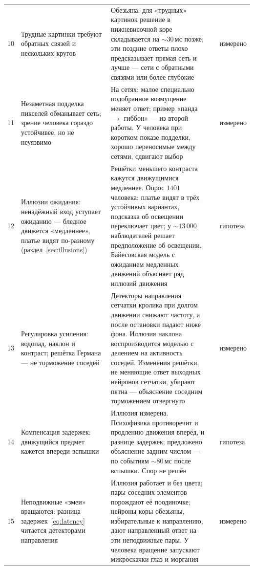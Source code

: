{\begin{longtable}{>{\raggedright}p{0.5cm}>{\raggedright}p{4.0cm}>{\raggedright}p{5.6cm}>{\raggedright}p{2.3cm}>{\raggedright\arraybackslash}p{1.7cm}}
10 & Трудные картинки требуют обратных связей и нескольких кругов & Обезьяна: для «трудных» картинок решение в нижневисочной коре складывается на $\sim30$\,мс позже; эти поздние ответы плохо предсказывает прямая сеть и лучше --- сети с обратными связями или более глубокие & \cite{Kar2019} & измерено \\
11 & Незаметная подделка пикселей обманывает сеть; зрение человека гораздо устойчивее, но не неуязвимо & На сетях: малое специально подобранное возмущение меняет ответ; пример «панда $\to$ гиббон» --- из второй работы. У человека при коротком показе подделки, хорошо переносимые между сетями, сдвигают выбор & \cite{Szegedy2014,Goodfellow2015,Elsayed2018} & измерено \\
12 & Иллюзии ожидания: ненадёжный вход уступает ожиданию --- бледное движется «медленнее», платье видят по-разному (раздел~\ref{sec:illusions}) & Решётки меньшего контраста кажутся движущимися медленнее. Опрос $1401$ человека: платье видят в трёх устойчивых вариантах, подсказка об освещении переключает цвет; у $\sim13\,000$ наблюдателей решает предположение об освещении. Байесовская модель с ожиданием медленных движений объясняет ряд иллюзий движения & \cite{Thompson1982,LaferSousa2015,Wallisch2017,Weiss2002,Purves2011} & гипотеза \\
13 & Регулировка усиления: водопад, наклон и контраст; решётка Германа --- не торможение соседей & Детекторы направления сетчатки кролика при долгом движении снижают частоту, а после остановки падают ниже фона. Иллюзия наклона воспроизводится моделью с делением на активность соседей. Изменения решётки, не меняющие ответ выходных нейронов сетчатки, убирают пятна --- объяснение соседним торможением отвергнуто & \cite{BarlowHill1963,Schwartz2009,SchillerCarvey2005} & измерено \\
14 & Компенсация задержек: движущийся предмет кажется впереди вспышки & Иллюзия измерена. Психофизика противоречит и продлению движения вперёд, и разнице задержек; предложено объяснение задним числом --- по событиям $\sim80$\,мс после вспышки. Спор не решён & \cite{Nijhawan1994,EaglemanSejnowski2000} & гипотеза \\
15 & Неподвижные «змеи» вращаются: разница задержек~\eqref{eq:latency} читается детекторами направления & Иллюзия работает и без цвета; пары соседних элементов порождают её поодиночке; нейроны коры обезьяны, избирательные к направлению, дают направленный ответ на эти неподвижные пары. У человека вращение запускают микроскачки глаз и моргания & \cite{Conway2005,OteroMillan2012} & измерено \\

\end{longtable}}

